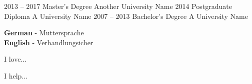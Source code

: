 \documentclass[9pt]{developercv} %
\begin{document}


\begin{entrylist}
	\entry
	{2013 -- 2017}
	{Master's Degree}
	{Another University Name}
	{\lorem\lorem\lorem}
	\entry
	{2014}
	{Postgraduate Diploma}
	{A University Name}
	{\lorem\lorem}
	\entry
	{2007 -- 2013}
	{Bachelor's Degree}
	{A University Name}
	{\lorem\lorem}
\end{entrylist}


\begin{minipage}[t]{0.3\textwidth}
	\vspace{-\baselineskip} %


	\textbf{German} - Muttersprache\\
	\textbf{English} - Verhandlungsicher %
\end{minipage}
\hfill
\begin{minipage}[t]{0.3\textwidth}
	\vspace{-\baselineskip} %


	I love... \lorem
\end{minipage}
\hfill
\begin{minipage}[t]{0.3\textwidth}
	\vspace{-\baselineskip} %


	I help... \lorem
\end{minipage}

\end{document}
